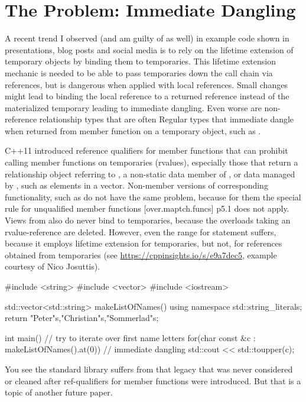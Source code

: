 \documentclass[ebook,11pt,article]{memoir}
\begin{document}
\section{The Problem: Immediate Dangling}

A recent trend I observed (and am guilty of as well) in example code shown in presentations, blog posts and social media is to rely on the lifetime extension of temporary objects by binding them to temporaries.
This lifetime extension mechanic is needed to be able to pass temporaries down the call chain via references, but is dangerous when applied with local references.
Small changes might lead to binding the local reference to a returned reference instead of the materialized temporary leading to immediate dangling.
Even worse are non-reference relationship types that are often Regular types that immediate dangle when returned from member function on a temporary object, such as .

C++11 introduced reference qualifiers for member functions that can prohibit calling member functions on temporaries (rvalues), especially those that return a relationship object referring to , a non-static data member of , or data managed by , such as elements in a vector.
Non-member versions of corresponding functionality, such as  do not have the same problem, because for them the special rule for unqualified member functions [over.maptch.funcs] p5.1 does not apply. Views from  also do never bind to temporaries, because the overloads taking an rvalue-reference are deleted.
However, even the range for statement suffers, because it employs lifetime extension for temporaries, but not, for references obtained from temporaries (see \url{https://cppinsights.io/s/e9a7dec5}, example courtesy of Nico Josuttis).

\begin{codeblock}
#include <string>
#include <vector>
#include <iostream>

std::vector<std::string> makeListOfNames(){
	using namespace std::string_literals;
	return {"Peter"s,"Christian"s,"Sommerlad"s};
}

int main() {
    // try to iterate over first name letters
	for(char const &c : makeListOfNames().at(0)){ // immediate dangling
		std::cout << std::toupper(c);
	}
}
\end{codeblock}

You see the standard library suffers from that legacy that was never considered or cleaned after ref-qualifiers for member functions were introduced. But that is a topic of another future paper.
\end{document}
